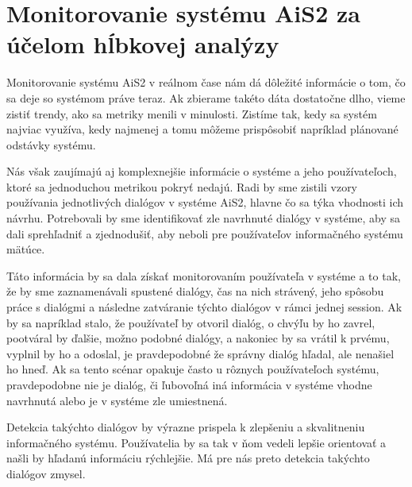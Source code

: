 \documentclass[a4paper, upjsfrontpage, disablespecwarning, thesismargins, thesislinespacing]{rnthesis}
\begin{document}


\section{Monitorovanie systému AiS2 za účelom hĺbkovej analýzy}

Monitorovanie systému AiS2 v reálnom čase nám dá dôležité informácie o tom, čo sa deje so systémom práve teraz.
Ak zbierame takéto dáta dostatočne dlho, vieme zistiť trendy, ako sa metriky menili v minulosti.
Zistíme tak, kedy sa systém najviac využíva, kedy najmenej a tomu môžeme prispôsobiť napríklad plánované odstávky systému.

Nás však zaujímajú aj komplexnejšie informácie o systéme a jeho používateľoch, ktoré sa jednoduchou metrikou pokryť nedajú.
Radi by sme zistili vzory používania jednotlivých dialógov v systéme AiS2, hlavne čo sa týka vhodnosti ich návrhu.
Potrebovali by sme identifikovať zle navrhnuté dialógy v systéme, aby sa dali sprehľadniť a zjednodušiť, aby neboli pre používateľov informačného systému mätúce.

Táto informácia by sa dala získať monitorovaním používateľa v systéme a to tak, že by sme zaznamenávali spustené dialógy, čas na nich strávený, jeho spôsobu práce s dialógmi a následne zatváranie týchto dialógov v rámci jednej session.
Ak by sa napríklad stalo, že používateľ by otvoril dialóg, o chvýľu by ho zavrel, pootváral by ďalšie, možno podobné dialógy, a nakoniec by sa vrátil k prvému, vyplnil by ho a odoslal, je pravdepodobné že správny dialóg hľadal, ale nenašiel ho hneď.
Ak sa tento scénar opakuje často u rôznych používateľoch systému, pravdepodobne nie je dialóg, či ľubovoľná iná informácia v systéme vhodne navrhnutá alebo je v systéme zle umiestnená.

Detekcia takýchto dialógov by výrazne prispela k zlepšeniu a skvalitneniu informačného systému.
Používatelia by sa tak v ňom vedeli lepšie orientovať a našli by hľadanú informáciu rýchlejšie.
Má pre nás preto detekcia takýchto dialógov zmysel.
\end{document}
